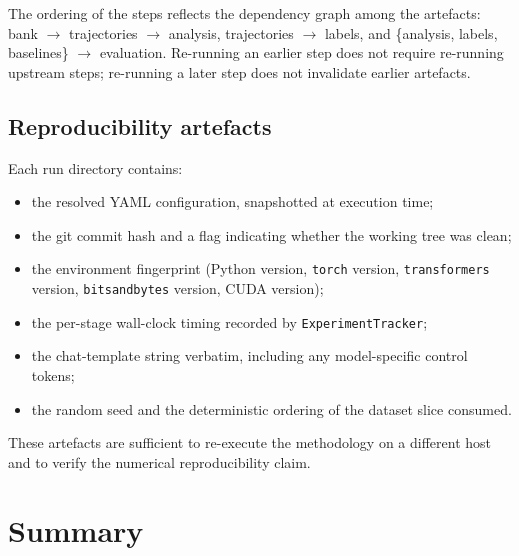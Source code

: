 The ordering of the steps reflects the dependency graph among the
artefacts: bank $\rightarrow$ trajectories $\rightarrow$ analysis,
trajectories $\rightarrow$ labels, and \{analysis, labels, baselines\}
$\rightarrow$ evaluation. Re-running an earlier step does not require
re-running upstream steps; re-running a later step does not invalidate
earlier artefacts.

\subsection{Reproducibility artefacts}
\label{subsec:reproducibility}

Each run directory contains:

\begin{itemize}[leftmargin=*]
    \item the resolved YAML configuration, snapshotted at execution time;
    \item the git commit hash and a flag indicating whether the working
          tree was clean;
    \item the environment fingerprint (Python version, \texttt{torch}
          version, \texttt{transformers} version, \texttt{bitsandbytes}
          version, CUDA version);
    \item the per-stage wall-clock timing recorded by
          \texttt{ExperimentTracker};
    \item the chat-template string verbatim, including any model-specific
          control tokens;
    \item the random seed and the deterministic ordering of the dataset
          slice consumed.
\end{itemize}

These artefacts are sufficient to re-execute the methodology on a
different host and to verify the numerical reproducibility claim.

\section{Summary}
\label{sec:method_summary}

